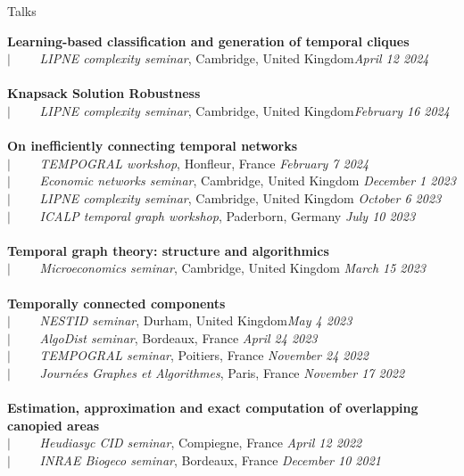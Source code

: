 \documentclass[french]{resume} %
\begin{document}
	\begin{rSection}{Talks}
		
		{\bf Learning-based classification and generation of temporal cliques} \\
		$| \qquad$ \textit{LIPNE complexity seminar}, Cambridge, United Kingdom\hfill {\em April 12 2024} 
		\\ \\
		{\bf Knapsack Solution Robustness} \\
		$| \qquad$ \textit{LIPNE complexity seminar}, Cambridge, United Kingdom\hfill {\em February 16 2024} 
		\\ \\
		{\bf On inefficiently connecting temporal networks} \\
		$| \qquad$ \textit{TEMPOGRAL workshop}, Honfleur, France \hfill {\em February 7 2024} \\
		$| \qquad$ \textit{Economic networks seminar}, Cambridge, United Kingdom \hfill {\em December 1 2023} \\
		$| \qquad$ \textit{LIPNE complexity seminar}, Cambridge, United Kingdom \hfill {\em October 6 2023} \\
		$| \qquad$ \textit{ICALP temporal graph workshop}, Paderborn, Germany \hfill {\em July 10 2023}
		\\ \\
		{\bf Temporal graph theory: structure and algorithmics} \\
		$| \qquad$ \textit{Microeconomics seminar}, Cambridge, United Kingdom \hfill {\em March 15 2023} 
		\\ \\
		{\bf Temporally connected components} \\
		$| \qquad$ \textit{NESTID seminar}, Durham, United Kingdom\hfill {\em May 4 2023} \\
		$| \qquad$ \textit{AlgoDist seminar}, Bordeaux, France \hfill {\em April 24 2023} \\
		$| \qquad$ \textit{TEMPOGRAL seminar}, Poitiers, France \hfill {\em November 24 2022} \\
		$| \qquad$ \textit{Journées Graphes et Algorithmes}, Paris, France \hfill {\em November 17 2022}
		\\ \\
		{\bf Estimation, approximation and exact computation of overlapping canopied areas} \\
		$| \qquad$ \textit{Heudiasyc CID seminar}, Compiegne, France \hfill {\em April 12 2022} \\
		$| \qquad$ \textit{INRAE Biogeco seminar}, Bordeaux, France \hfill {\em December 10 2021} 

\end{rSection}
\end{document}
